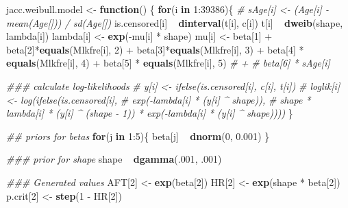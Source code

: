 \documentclass[]{tufte-handout}
\newenvironment{Shaded}{}{}
\newcommand{\CommentTok}[1]{\textcolor[rgb]{0.38,0.63,0.69}{\textit{#1}}}
\newcommand{\ControlFlowTok}[1]{\textcolor[rgb]{0.00,0.44,0.13}{\textbf{#1}}}
\newcommand{\DecValTok}[1]{\textcolor[rgb]{0.25,0.63,0.44}{#1}}
\newcommand{\FloatTok}[1]{\textcolor[rgb]{0.25,0.63,0.44}{#1}}
\newcommand{\KeywordTok}[1]{\textcolor[rgb]{0.00,0.44,0.13}{\textbf{#1}}}
\newcommand{\NormalTok}[1]{#1}
\newcommand{\OperatorTok}[1]{\textcolor[rgb]{0.40,0.40,0.40}{#1}}
\newcommand{\StringTok}[1]{\textcolor[rgb]{0.25,0.44,0.63}{#1}}
\begin{document}
\begin{Shaded}
\begin{Highlighting}[]
\NormalTok{jacc.weibull.model <-}\StringTok{ }\ControlFlowTok{function}\NormalTok{() \{}
  \ControlFlowTok{for}\NormalTok{(i }\ControlFlowTok{in} \DecValTok{1}\OperatorTok{:}\DecValTok{39386}\NormalTok{)\{}
    \CommentTok{# sAge[i] <- (Age[i] - mean(Age[])) / sd(Age[])}
\NormalTok{    is.censored[i] }\OperatorTok{~}\StringTok{ }\KeywordTok{dinterval}\NormalTok{(t[i], c[i])}
\NormalTok{    t[i] }\OperatorTok{~}\StringTok{ }\KeywordTok{dweib}\NormalTok{(shape, lambda[i])}
\NormalTok{    lambda[i] <-}\StringTok{ }\KeywordTok{exp}\NormalTok{(}\OperatorTok{-}\NormalTok{mu[i] }\OperatorTok{*}\StringTok{ }\NormalTok{shape)}
\NormalTok{    mu[i] <-}\StringTok{ }\NormalTok{beta[}\DecValTok{1}\NormalTok{] }\OperatorTok{+}\StringTok{ }\NormalTok{beta[}\DecValTok{2}\NormalTok{]}\OperatorTok{*}\KeywordTok{equals}\NormalTok{(Mlkfre[i], }\DecValTok{2}\NormalTok{) }\OperatorTok{+}
\StringTok{      }\NormalTok{beta[}\DecValTok{3}\NormalTok{]}\OperatorTok{*}\KeywordTok{equals}\NormalTok{(Mlkfre[i], }\DecValTok{3}\NormalTok{) }\OperatorTok{+}\StringTok{ }\NormalTok{beta[}\DecValTok{4}\NormalTok{] }\OperatorTok{*}\StringTok{ }\KeywordTok{equals}\NormalTok{(Mlkfre[i], }\DecValTok{4}\NormalTok{) }\OperatorTok{+}
\StringTok{      }\NormalTok{beta[}\DecValTok{5}\NormalTok{] }\OperatorTok{*}\StringTok{ }\KeywordTok{equals}\NormalTok{(Mlkfre[i], }\DecValTok{5}\NormalTok{) }\CommentTok{# + }
      \CommentTok{# beta[6] * sAge[i]}
    
    \CommentTok{### calculate log-likelihoods}
    \CommentTok{# y[i] <- ifelse(is.censored[i], c[i], t[i])}
    \CommentTok{# loglik[i] <- log(ifelse(is.censored[i],}
    \CommentTok{#                  exp(-lambda[i] * (y[i] ^ shape)),}
    \CommentTok{#               shape * lambda[i] * (y[i] ^ (shape - 1)) * exp(-lambda[i] * (y[i] ^ shape))))}
\NormalTok{  \}}
  
  \CommentTok{## priors for betas}
  \ControlFlowTok{for}\NormalTok{(j }\ControlFlowTok{in} \DecValTok{1}\OperatorTok{:}\DecValTok{5}\NormalTok{)\{}
\NormalTok{    beta[j] }\OperatorTok{~}\StringTok{ }\KeywordTok{dnorm}\NormalTok{(}\DecValTok{0}\NormalTok{, }\FloatTok{0.001}\NormalTok{)}
\NormalTok{  \}}
  
  \CommentTok{### prior for shape}
\NormalTok{  shape }\OperatorTok{~}\StringTok{ }\KeywordTok{dgamma}\NormalTok{(.}\DecValTok{001}\NormalTok{, }\FloatTok{.001}\NormalTok{)}
  
  \CommentTok{### Generated values}
\NormalTok{  AFT[}\DecValTok{2}\NormalTok{] <-}\StringTok{ }\KeywordTok{exp}\NormalTok{(beta[}\DecValTok{2}\NormalTok{])}
\NormalTok{  HR[}\DecValTok{2}\NormalTok{] <-}\StringTok{ }\KeywordTok{exp}\NormalTok{(shape }\OperatorTok{*}\StringTok{ }\NormalTok{beta[}\DecValTok{2}\NormalTok{])}
\NormalTok{  p.crit[}\DecValTok{2}\NormalTok{] <-}\StringTok{ }\KeywordTok{step}\NormalTok{(}\DecValTok{1} \OperatorTok{-}\StringTok{ }\NormalTok{HR[}\DecValTok{2}\NormalTok{])}
  

\end{Highlighting}
\end{Shaded}
\end{document}
